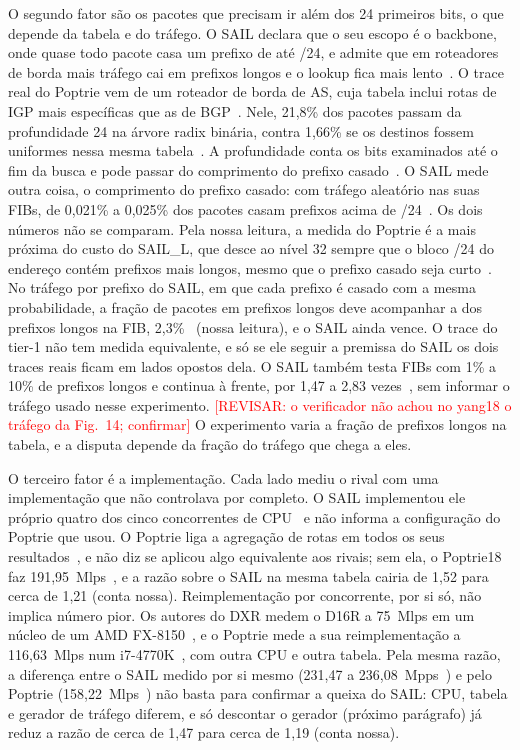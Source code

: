 \documentclass[conference,a4paper]{IEEEtran}
\newcommand{\revisar}[1]{\textcolor{red}{[REVISAR: #1]}}
\begin{document}
O segundo fator são os pacotes que precisam ir além dos 24 primeiros bits, o que depende da tabela e do tráfego. O SAIL
declara que o seu escopo é o backbone, onde quase todo pacote casa um prefixo de até /24, e admite que em roteadores de
borda mais tráfego cai em prefixos longos e o lookup fica mais lento~\cite[\S I-C, \S VI-A]{yang18}. O trace real do
Poptrie vem de um roteador de borda de AS, cuja tabela inclui rotas de IGP mais específicas que as de
BGP~\cite[\S4.1, \S4.7]{asai15}. Nele, 21,8\% dos pacotes passam da profundidade 24 na árvore radix binária, contra 1,66\%
se os destinos fossem uniformes nessa mesma tabela~\cite[\S4.7]{asai15}. A profundidade conta os bits examinados até o
fim da busca e pode passar do comprimento do prefixo casado~\cite[\S4.1, Fig.~7]{asai15}. O SAIL mede outra coisa, o
comprimento do prefixo casado: com tráfego aleatório nas suas FIBs, de 0,021\% a 0,025\% dos pacotes casam prefixos acima
de /24~\cite[\S VI-C, Fig.~11]{yang18}. Os dois números não se comparam. Pela nossa leitura, a medida do Poptrie é a mais
próxima do custo do SAIL\_L, que desce ao nível 32 sempre que o bloco /24 do endereço contém prefixos mais longos, mesmo
que o prefixo casado seja curto~\cite[\S IV]{yang18}. No tráfego por prefixo do SAIL, em que cada prefixo é casado com a
mesma probabilidade, a fração de pacotes em prefixos longos deve acompanhar a dos prefixos longos na FIB,
2,3\%~\cite[\S VI-C]{yang18} (nossa leitura), e o SAIL ainda vence. O trace do tier-1 não tem medida equivalente, e só se
ele seguir a premissa do SAIL os dois traces reais ficam em lados opostos dela. O SAIL também testa FIBs com 1\% a 10\% de
prefixos longos e continua à frente, por 1,47 a 2,83 vezes~\cite[\S VI-C, Fig.~14]{yang18}, sem informar o tráfego usado
nesse experimento. \revisar{o verificador não achou no yang18 o tráfego da Fig.~14; confirmar} O experimento varia a
fração de prefixos longos na tabela, e a disputa depende da fração do tráfego que chega a eles.

O terceiro fator é a implementação. Cada lado mediu o rival com uma implementação que não controlava por completo. O SAIL
implementou ele próprio quatro dos cinco concorrentes de CPU~\cite[\S VIII]{yang18} e não informa a configuração do Poptrie
que usou. O Poptrie liga a agregação de rotas em todos os seus resultados~\cite[\S3]{asai15}, e não diz se aplicou algo
equivalente aos rivais; sem ela, o Poptrie18 faz 191,95~Mlps~\cite[Tab.~2]{asai15}, e a razão sobre o SAIL na mesma tabela
cairia de 1,52 para cerca de 1,21 (conta nossa). Reimplementação por concorrente, por si só, não implica número pior. Os
autores do DXR medem o D16R a 75~Mlps em um núcleo de um AMD FX-8150~\cite[Tab.~2]{zec12}, e o Poptrie mede a sua
reimplementação a 116,63~Mlps num i7-4770K~\cite[Tab.~3]{asai15}, com outra CPU e outra tabela. Pela mesma razão, a
diferença entre o SAIL medido por si mesmo (231,47 a 236,08~Mpps~\cite[\S VI-C]{yang18}) e pelo Poptrie
(158,22~Mlps~\cite[Tab.~3]{asai15}) não basta para confirmar a queixa do SAIL: CPU, tabela e gerador de tráfego diferem, e
só descontar o gerador (próximo parágrafo) já reduz a razão de cerca de 1,47 para cerca de 1,19 (conta nossa).
\end{document}
